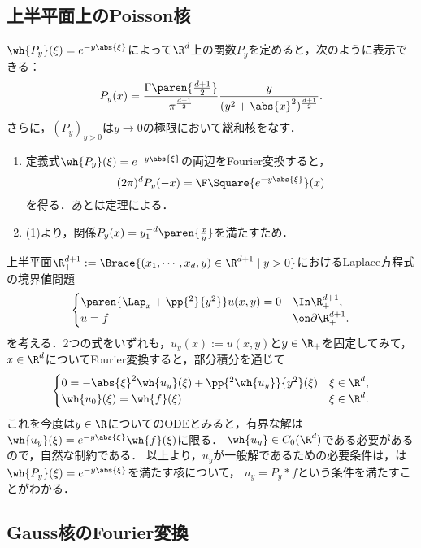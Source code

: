 \documentclass[uplatex,dvipdfmx]{jsreport}
\begin{document}
\subsection{上半平面上のPoisson核}

\begin{theorem}[Poisson核の表示]
    $\wh{P_y}(\xi)=e^{-y\abs{\xi}}$によって$\R^d$上の関数$P_y$を定めると，次のように表示できる：
    \[P_y(x)=\frac{\Gamma\paren{\frac{d+1}{2}}}{\pi^{\frac{d+1}{2}}}\frac{y}{(y^2+\abs{x}^2)^{\frac{d+1}{2}}}.\]
    さらに，$(P_y)_{y>0}$は$y\to0$の極限において総和核をなす．
\end{theorem}
\begin{Proof}\mbox{}
    \begin{enumerate}
        \item 定義式$\wh{P_y}(\xi)=e^{-y\abs{\xi}}$の両辺をFourier変換すると，
        \[(2\pi)^dP_y(-x)=\F\Square{e^{-y\abs{\xi}}}(x)\]
        を得る．あとは定理による．
        \item (1)より，関係$P_y(x)=y^{-d}_1\paren{\frac{x}{y}}$を満たすため．
    \end{enumerate}
\end{Proof}

\begin{observation}[Laplace方程式の空間についてのFourier変換]
    上半平面$\R^{d+1}_+:=\Brace{(x_1,\cdots,x_d,y)\in\R^{d+1}\mid y>0}$におけるLaplace方程式の境界値問題
    \[\begin{cases}
        \paren{\Lap_x+\pp{^2}{y^2}}u(x,y)=0&\In\R^{d+1}_+,\\
        u=f&\on\partial\R^{d+1}_+.
    \end{cases}\]
    を考える．2つの式をいずれも，$u_y(x):=u(x,y)$と$y\in\R_+$を固定してみて，$x\in\R^d$についてFourier変換すると，部分積分を通じて
    \[\begin{cases}
        0=-\abs{\xi}^2\wh{u_y}(\xi)+\pp{^2\wh{u_y}}{y^2}(\xi)&\xi\in\R^d,\\
        \wh{u_0}(\xi)=\wh{f}(\xi)&\xi\in\R^d.
    \end{cases}\]
    これを今度は$y\in\R$についてのODEとみると，有界な解は$\wh{u_y}(\xi)=e^{-y\abs{\xi}}\wh{f}(\xi)$に限る．
    $\wh{u_y}\in C_0(\R^d)$である必要があるので，自然な制約である．
    以上より，$u_y$が一般解であるための必要条件は，は$\wh{P_y}(\xi)=e^{-y\abs{\xi}}$を満たす核について，
    $u_y=P_y*f$という条件を満たすことがわかる．
\end{observation}

\subsection{Gauss核のFourier変換}
\end{document}
